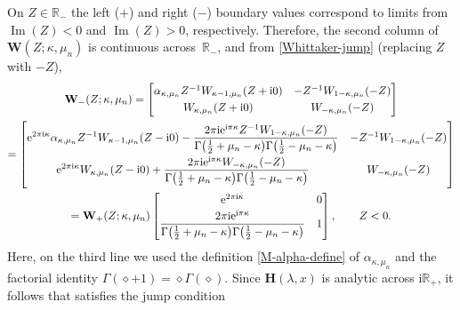 \documentclass[11pt]{article}
\numberwithin{equation}{section}
\numberwithin{equation}{section}
\newcommand{\ee}{\mathrm{e}}
\newcommand{\ii}{\mathrm{i}}
\newcommand{\para}[1]{\breve{#1}}
\newcommand{\R}{{\mathbb{R}}}
\newcommand{\im}{\operatorname{Im}}
\begin{document}
On $Z\in\R_-$ the left ($+$) and right ($-$) boundary values correspond to limits from ${\im(Z)<0}$ and $\im(Z)>0$, respectively. Therefore, the second column of $\mathbf{W}(Z;\kappa,\mu_n)$ is continuous across~$\mathbb{R}_-$, and from \eqref{Whittaker-jump} (replacing $Z$ with $-Z$),
\begin{gather*}%
 \mathbf{W}_{-}(Z;\kappa,\mu_n)
 =
 \begin{bmatrix}
 \alpha_{\kappa,\mu_n}Z^{-1}W_{\kappa-1,\mu_n}(Z+\ii 0) & -Z^{-1}W_{1-\kappa,\mu_n}(-Z)\vspace{1mm}\\
 W_{\kappa,\mu_n}(Z+\ii 0) & W_{-\kappa,\mu_n}(-Z)
 \end{bmatrix}\\
 =\begin{bmatrix}
 \displaystyle \ee^{2\pi \ii\kappa}\alpha_{\kappa,\mu_n}Z^{-1}W_{\kappa-1,\mu_n}(Z-\ii 0) - \frac{2\pi \ii\ee^{\ii\pi \kappa}Z^{-1}W_{1-\kappa,\mu_n}(-Z)}{\Gamma\big(\frac{1}{2}+\mu_n-\kappa\big)\Gamma\big(\frac{1}{2}-\mu_n-\kappa\big)}& -Z^{-1}W_{1-\kappa,\mu_n}(-Z)\vspace{1mm}\\
 \displaystyle \ee^{2\pi \ii\kappa}W_{\kappa,\mu_n}(Z-\ii 0)+\frac{2\pi \ii\ee^{\ii\pi\kappa}W_{-\kappa,\mu_n}(-Z)}{\Gamma\big(\frac{1}{2}+\mu_n-\kappa\big)\Gamma\big(\frac{1}{2}-\mu_n-\kappa\big)} & W_{-\kappa,\mu_n}(-Z)
 \end{bmatrix}\\
 =\mathbf{W}_{+}(Z;\kappa,\mu_n)\begin{bmatrix}
 \ee^{2\pi \ii\kappa} & 0\vspace{1mm}\\
 \displaystyle \frac{2\pi \ii\ee^{\ii\pi\kappa}}{\Gamma\big(\frac{1}{2}+\mu_n-\kappa\big)\Gamma\big(\frac{1}{2}-\mu_n-\kappa\big)} & 1
 \end{bmatrix},\qquad Z<0.
\end{gather*}
Here, on the {third} line we used the definition \eqref{M-alpha-define} of $\alpha_{\kappa,\mu_n}$ and the factorial identity $\Gamma(\diamond+1)=\diamond\Gamma(\diamond)$. Since $\mathbf{H}(\lambda,x)$ is analytic across $\ii\mathbb{R}_+$, it follows that \smash{$\para{\mathbf{\Phi}}^{(\infty)}(\lambda)=\para{\mathbf{\Phi}}_n^{(\infty)}(\lambda,x)$} satisfies the jump condition
\end{document}
